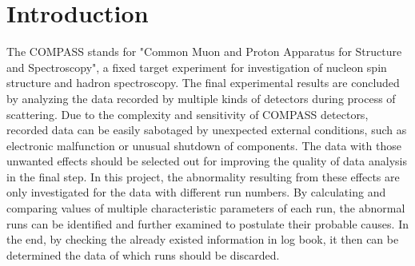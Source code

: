 \section{Introduction}
The COMPASS stands for "Common Muon and Proton Apparatus for Structure and Spectroscopy", a fixed target experiment for investigation of nucleon spin structure and hadron spectroscopy. The final experimental results are concluded by analyzing the data recorded by multiple kinds of detectors during process of scattering. Due to the complexity and sensitivity of COMPASS detectors, recorded data can be easily sabotaged by unexpected external conditions, such as electronic malfunction or unusual shutdown of components. The data with those unwanted effects should be selected out for improving the quality of data analysis in the final step. In this project, the abnormality resulting from these effects are only investigated for the data with different run numbers. By calculating and comparing values of multiple characteristic parameters of each run, the abnormal runs can be identified and further examined to postulate their probable causes. In the end, by checking the already existed information in log book, it then can be determined the data of which runs should be discarded.
